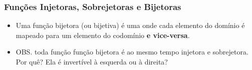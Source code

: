 \documentclass[usenames,dvipsnames,svgnames]{beamer}
\begin{document}
\begin{frame}	
	\frametitle{Funções Injetoras, Sobrejetoras e Bijetoras}

	\begin{itemize}
		\item Uma função bijetora (ou bijetiva) é uma onde cada elemento do domínio é mapeado para um elemento do codomínio \textbf{e vice-versa}.
		\item OBS. toda função função bijetora é ao mesmo tempo injetora e sobrejetora. Por quê? Ela é invertível à esquerda ou à direita?
	\end{itemize}

	\begin{adjustbox}{max totalsize={\textwidth}{.65\textheight},center}
	\end{adjustbox}

\end{frame}
\end{document}
